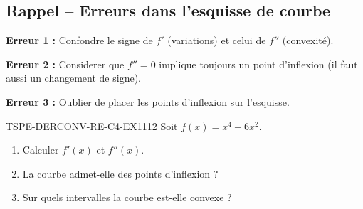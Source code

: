 

\subsection*{Rappel -- Erreurs dans l'esquisse de courbe}

\textbf{Erreur 1 :} Confondre le signe de $f'$ (variations) et celui de $f''$ (convexité).

\textbf{Erreur 2 :} Considerer que $f'' = 0$ implique toujours un point d'inflexion (il faut aussi un changement de signe).

\textbf{Erreur 3 :} Oublier de placer les points d'inflexion sur l'esquisse.

\begin{exercice}{TSPE-DERCONV-RE-C4-EX1}{1}{12}
Soit $f(x) = x^4 - 6x^2$.
\begin{enumerate}
  \item Calculer $f'(x)$ et $f''(x)$.
  \item La courbe admet-elle des points d'inflexion ?
  \item Sur quels intervalles la courbe est-elle convexe ?
\end{enumerate}
\end{exercice}

